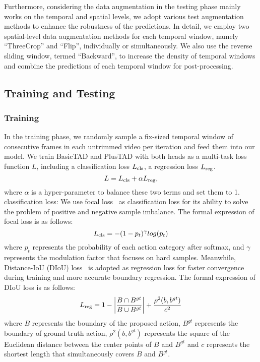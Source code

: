 \documentclass[a4paper,fleqn]{cas-dc}
\begin{document}
Furthermore, considering the data augmentation in the testing phase mainly works on the temporal and spatial levels, we adopt various test augmentation methods to enhance the robustness of the predictions. 
In detail, we employ two spatial-level data augmentation methods for each temporal window, namely ``ThreeCrop'' and ``Flip'', individually or simultaneously. 
We also use the reverse sliding window, termed ``Backward'', to increase the density of temporal windows and combine the predictions of each temporal window for post-processing.

\subsection{Training and Testing}
\subsubsection{Training} 
In the training phase, we randomly sample a fix-sized temporal window of consecutive frames in each untrimmed video per iteration and feed them into our model.
We train BasicTAD and PlusTAD with both heads as a multi-task loss function $L$, including a classification loss  $L_{\rm cls}$, a regression loss $L_{\rm reg}$.
\begin{equation}
L=L_{\rm cls}+\alpha L_{\rm reg},
\end{equation} 
where $\alpha$ is a hyper-parameter to balance these two terms and set them to 1. classification loss: We use focal loss~\citep{focalloss} as classification loss for its ability to solve the problem of positive and negative sample imbalance. The formal expression of focal loss is as follows:
\begin{equation}
L_{\rm cls}=-(1-p_t)^{\gamma}log(p_t)
\end{equation} 
where $p_t$ represents the probability of each action category after softmax, and $\gamma$ represents the modulation factor that focuses on hard samples. 
Meanwhile, Distance-IoU (DIoU) loss~\citep{diou} is adopted as regression loss for faster convergence during training and more accurate boundary regression. The formal expression of DIoU loss is as follows:
\begin{equation}
L_{\rm reg}=1-\left |  \frac{B\cap B^{gt}}{B \cup  B^{gt}}  \right | + \frac{\rho^{2}(b,b^{gt})}{c^{2}} 
\end{equation} 
where $B$ represents the boundary of the proposed action, $B^{gt}$ represents the boundary of ground truth action, $\rho^{2}(b,b^{gt})$ represents the square of the Euclidean distance between the center points of $B$ and $B^{gt}$ and $c$ represents the shortest length that simultaneously covers $B$ and $B^{gt}$.
\end{document}
